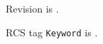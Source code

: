 \documentclass{article}
\begin{document}
Revision is \RCSRevision.

RCS tag \texttt{Keyword} is \RCSKeyword.
\end{document}
